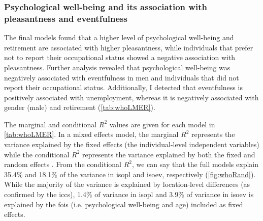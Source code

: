 \subsubsection*{Psychological well-being and its association with pleasantness and eventfulness}


The final models found that a higher level of psychological well-being and retirement are associated with higher pleasantness, while individuals that prefer not to report their occupational status showed a negative association with pleasantness. Further analysis revealed that psychological well-being was negatively associated with eventfulness in men and individuals that did not report their occupational status. Additionally, I detected that eventfulness is positively associated with unemployment, whereas it is negatively associated with gender (male) and retirement (\cref{tab:whoLMER}).

The marginal and conditional $R^2$ values are given for each model in \cref{tab:whoLMER}. In a mixed effects model, the marginal $R^2$ represents the variance explained by the fixed effects (the individual-level independent variables) while the conditional $R^2$ represents the variance explained by both the fixed and random effects \citep{Nakagawa2012general}. From the conditional $R^2$, we can say that the full models explain 35.4\% and 18.1\% of the variance in \gls{isopl} and \gls{isoev}, respectively (\cref{fig:whoRand}). While the majority of the variance is explained by location-level differences (as confirmed by the \glspl{icc}), 1.4\% of variance in \gls{isopl} and 3.9\% of variance in \gls{isoev} is explained by the \glspl{foi} (i.e. psychological well-being and age) included as fixed effects.

